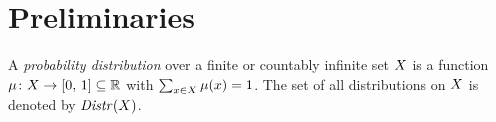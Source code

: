 \section{Preliminaries}
\label{sec:preliminaries}
%


% 
A \emph{probability distribution} over a finite or countably infinite set $X$ is a function $\mu\colon X\rightarrow[0,\, 1]\subseteq\mathbb{R}$ with $\sum_{x\in X}\mu(x)=1$. 
The set of all distributions on $X$ is denoted by $\mathit{Distr}(X)$.

